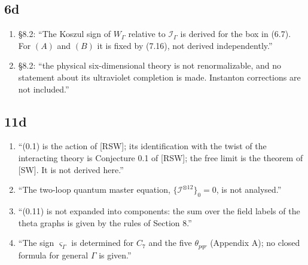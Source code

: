 \documentclass[10pt,a4paper]{article}
\numberwithin{equation}{section}
\newcommand{\cI}{\mathcal I}
\begin{document}
\subsection{\textsf{6d}}
\begin{enumerate}\itemsep1pt
\item \S8.2: ``The Koszul sign of $W_\Gamma$ relative to $\cI_\Gamma$ is derived for the box in (6.7). For $(A)$ and $(B)$ it is fixed by (7.16), not derived independently.''
\item \S8.2: ``the physical six-dimensional theory is not renormalizable, and no statement about its ultraviolet completion is made. Instanton corrections are not included.''
\end{enumerate}

\subsection{\textsf{11d}}
\begin{enumerate}\itemsep1pt
\item ``(0.1) is the action of [RSW]; its identification with the twist of the interacting theory is Conjecture 0.1 of [RSW]; the free limit is the theorem of [SW]. It is not derived here.''
\item ``The two-loop quantum master equation, $\{\cI^{\otimes12}\}_0=0$, is not analysed.''
\item ``(0.11) is not expanded into components: the sum over the field labels of the theta graphs is given by the rules of Section 8.''
\item ``The sign $\varsigma_\Gamma$ is determined for $C_7$ and the five $\theta_{pqr}$ (Appendix A); no closed formula for general $\Gamma$ is given.''
\end{enumerate}
\end{document}
